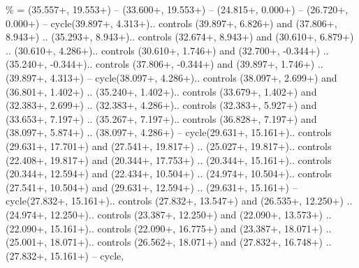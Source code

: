{\%} = {(35.557+\ctpXshift, 19.553+\ctpYshift) -- (33.600+\ctpXshift, 19.553+\ctpYshift) -- (24.815+\ctpXshift, 0.000+\ctpYshift) -- (26.720+\ctpXshift, 0.000+\ctpYshift) -- cycle(39.897+\ctpXshift, 4.313+\ctpYshift).. controls (39.897+\ctpXshift, 6.826+\ctpYshift) and (37.806+\ctpXshift, 8.943+\ctpYshift) .. (35.293+\ctpXshift, 8.943+\ctpYshift).. controls (32.674+\ctpXshift, 8.943+\ctpYshift) and (30.610+\ctpXshift, 6.879+\ctpYshift) .. (30.610+\ctpXshift, 4.286+\ctpYshift).. controls (30.610+\ctpXshift, 1.746+\ctpYshift) and (32.700+\ctpXshift, -0.344+\ctpYshift) .. (35.240+\ctpXshift, -0.344+\ctpYshift).. controls (37.806+\ctpXshift, -0.344+\ctpYshift) and (39.897+\ctpXshift, 1.746+\ctpYshift) .. (39.897+\ctpXshift, 4.313+\ctpYshift) -- cycle(38.097+\ctpXshift, 4.286+\ctpYshift).. controls (38.097+\ctpXshift, 2.699+\ctpYshift) and (36.801+\ctpXshift, 1.402+\ctpYshift) .. (35.240+\ctpXshift, 1.402+\ctpYshift).. controls (33.679+\ctpXshift, 1.402+\ctpYshift) and (32.383+\ctpXshift, 2.699+\ctpYshift) .. (32.383+\ctpXshift, 4.286+\ctpYshift).. controls (32.383+\ctpXshift, 5.927+\ctpYshift) and (33.653+\ctpXshift, 7.197+\ctpYshift) .. (35.267+\ctpXshift, 7.197+\ctpYshift).. controls (36.828+\ctpXshift, 7.197+\ctpYshift) and (38.097+\ctpXshift, 5.874+\ctpYshift) .. (38.097+\ctpXshift, 4.286+\ctpYshift) -- cycle(29.631+\ctpXshift, 15.161+\ctpYshift).. controls (29.631+\ctpXshift, 17.701+\ctpYshift) and (27.541+\ctpXshift, 19.817+\ctpYshift) .. (25.027+\ctpXshift, 19.817+\ctpYshift).. controls (22.408+\ctpXshift, 19.817+\ctpYshift) and (20.344+\ctpXshift, 17.753+\ctpYshift) .. (20.344+\ctpXshift, 15.161+\ctpYshift).. controls (20.344+\ctpXshift, 12.594+\ctpYshift) and (22.434+\ctpXshift, 10.504+\ctpYshift) .. (24.974+\ctpXshift, 10.504+\ctpYshift).. controls (27.541+\ctpXshift, 10.504+\ctpYshift) and (29.631+\ctpXshift, 12.594+\ctpYshift) .. (29.631+\ctpXshift, 15.161+\ctpYshift) -- cycle(27.832+\ctpXshift, 15.161+\ctpYshift).. controls (27.832+\ctpXshift, 13.547+\ctpYshift) and (26.535+\ctpXshift, 12.250+\ctpYshift) .. (24.974+\ctpXshift, 12.250+\ctpYshift).. controls (23.387+\ctpXshift, 12.250+\ctpYshift) and (22.090+\ctpXshift, 13.573+\ctpYshift) .. (22.090+\ctpXshift, 15.161+\ctpYshift).. controls (22.090+\ctpXshift, 16.775+\ctpYshift) and (23.387+\ctpXshift, 18.071+\ctpYshift) .. (25.001+\ctpXshift, 18.071+\ctpYshift).. controls (26.562+\ctpXshift, 18.071+\ctpYshift) and (27.832+\ctpXshift, 16.748+\ctpYshift) .. (27.832+\ctpXshift, 15.161+\ctpYshift) -- cycle},
